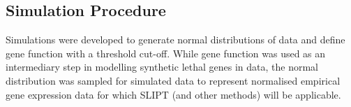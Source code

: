 \subsection{Simulation Procedure} \label{methods:simulating_SL}

Simulations were developed to generate normal distributions of  data and define gene function with a threshold cut-off. 
While gene function was used as an intermediary step in modelling \gls{synthetic lethal} genes in  data, the normal distribution was sampled for simulated data to represent normalised empirical \gls{gene expression} data for which \gls{SLIPT} (and other methods) will be applicable.

